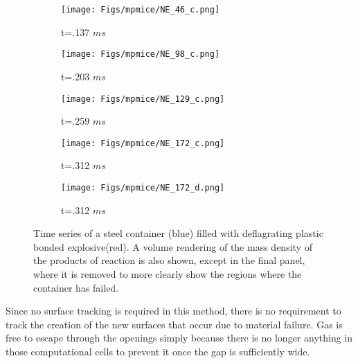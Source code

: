 \begin{figure}[htbp!]
   \centering
   \begin{subfigure}{0.3\textwidth}
     \texttt{[image: Figs/mpmice/NE\_46\_c.png]}
     \caption{t=.137 $ms$}
     \label{fig:figCookoff:b}
   \end{subfigure}
   \begin{subfigure}{0.3\textwidth}
     \texttt{[image: Figs/mpmice/NE\_98\_c.png]}
     \caption{t=.203 $ms$}
     \label{fig:figCookoff:c}
   \end{subfigure}
   \begin{subfigure}{0.3\textwidth}
     \texttt{[image: Figs/mpmice/NE\_129\_c.png]}
     \caption{t=.259 $ms$}
     \label{fig:figCookoff:d}
   \end{subfigure}
   \begin{subfigure}{0.3\textwidth}
     \texttt{[image: Figs/mpmice/NE\_172\_c.png]}
     \caption{t=.312 $ms$}
     \label{fig:figCookoff:e}
   \end{subfigure}
   \begin{subfigure}{0.3\textwidth}
     \texttt{[image: Figs/mpmice/NE\_172\_d.png]}
     \caption{t=.312 $ms$}
     \label{fig:figCookoff:f}
   \end{subfigure}
   \caption{Time series of a steel container (blue) filled with deflagrating 
            plastic bonded explosive(red).  A volume rendering of the mass 
            density of the products of reaction is also shown, except in the 
            final panel, where it is removed to more clearly show the regions 
            where the container has failed. }
   \label{fig:figCookoff}
\end{figure}

Since no surface tracking is required in this method, there is no
requirement to track the creation of the new surfaces that occur
due to material failure.  Gas is free to escape through the openings
simply because there is no longer anything in those computational
cells to prevent it once the gap is sufficiently wide.

